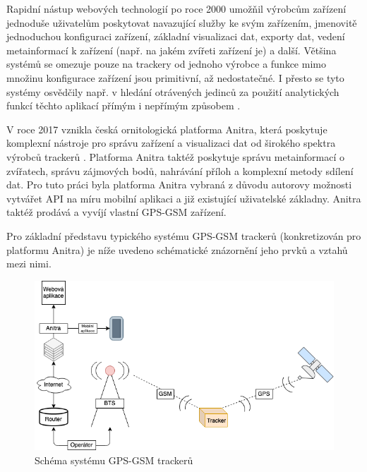 Rapidní nástup webových technologií po roce 2000 umožňil výrobcům zařízení jednoduše uživatelům poskytovat navazující služby ke svým zařízením, jmenovitě jednoduchou konfiguraci zařízení, základní visualizaci dat, exporty dat, vedení metainformací k zařízení (např. na jakém zvířeti zařízení je) a další. Většina systémů se omezuje pouze na trackery od jednoho výrobce a funkce mimo množinu konfigurace zařízení jsou primitivní, až nedostatečné. I přesto se tyto systémy osvědčily např. v hledání otrávených jedinců za použití analytických funkcí těchto aplikací přímým i nepřímým způsobem \cite{stoynov2018early}.

V roce 2017 vznikla česká ornitologická platforma Anitra, která poskytuje komplexní nástroje pro správu zařízení a visualizaci dat od širokého spektra výrobců trackerů \cite{krouzkovaniPtakuAnitra}. Platforma Anitra taktéž poskytuje správu metainformací o zvířatech, správu zájmových bodů, nahrávání příloh a komplexní metody sdílení dat. Pro tuto práci byla platforma Anitra vybraná z důvodu autorovy možnosti vytvářet API na míru mobilní aplikaci a již existující uživatelské základny. Anitra taktéž prodává a vyvíjí vlastní GPS-GSM zařízení.

Pro základní představu typického systému GPS-GSM trackerů (konkretizován pro platformu Anitra) je níže uvedeno schématické znázornění jeho prvků a vztahů mezi nimi.

\begin{figure}[h]
	\includegraphics[width=\linewidth]{img/diagram_system.png}
	\caption{Schéma systému GPS-GSM trackerů}
	\label{fig:boat1}
\end{figure}